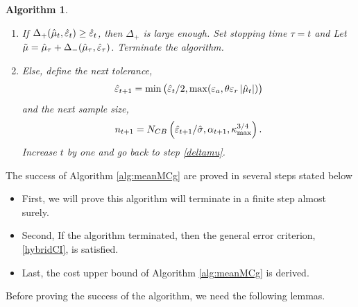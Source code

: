 \documentclass{iitthesis}
\newtheorem{theorem}{Theorem}[section]
\newtheorem{algorithm}[theorem]{Algorithm}
\theoremstyle{definition}
\begin{document}
\begin{algorithm}
\begin{enumerate}
\begin{enumerate}
\item If $\Delta_{+}(\hat{\mu}_t,\hat{\varepsilon}_t) \geq  \hat{\varepsilon}_t$, then $\Delta_{+}$ is large enough. Set stopping time $\tau = t$ and Let $\tilde{\mu} = \hat{\mu}_{\tau}+\Delta_{-}(\hat{\mu}_\tau,\hat{\varepsilon}_\tau)$. Terminate the algorithm.
\item Else, define the next tolerance, $$\hat{\varepsilon}_{t+1} = \min\left(\hat{\varepsilon}_t/2, \max(\varepsilon_a,\theta\varepsilon_r\left \lvert \hat{\mu}_t \right \rvert)\right)$$ and the next sample size, $$n_{t+1} = N_{CB}\left(\hat{\varepsilon}_{t+1}/\hat{\sigma},\alpha_{t+1},\kappa_{\max}^{3/4}\right).$$ Increase $t$ by one and go back to step \ref{deltamu}. 
\end{enumerate}
\end{enumerate}
\end{algorithm}
The success of Algorithm \ref{alg:meanMCg} are proved in several steps stated below
\begin{itemize}
\item First, we will prove this algorithm will terminate in a finite step almost surely.
\item Second, If the algorithm terminated, then the general error criterion, \eqref{hybridCI}, is satisfied.
\item Last, the cost upper bound of Algorithm \ref{alg:meanMCg} is derived.
\end{itemize}
Before proving the success of the algorithm, we need the following lemmas.
\end{document}
